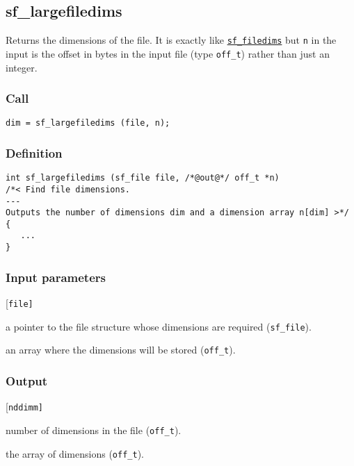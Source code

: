 \subsection{{sf\_largefiledims}}
Returns the dimensions of the file. It is exactly like \hyperref[sec:sf_filedims]{\texttt{sf\_filedims}} but \texttt{n} in the input is the offset in bytes in the input file (type \texttt{off\_t}) rather than just an integer.

\subsubsection*{Call}
\begin{verbatim}dim = sf_largefiledims (file, n);\end{verbatim}

\subsubsection*{Definition}
\begin{verbatim}
int sf_largefiledims (sf_file file, /*@out@*/ off_t *n) 
/*< Find file dimensions.
--- 
Outputs the number of dimensions dim and a dimension array n[dim] >*/
{
   ...
}
\end{verbatim}

\subsubsection*{Input parameters}
\begin{desclist}{\tt }{\quad}[\tt file]
   \setlength\itemsep{0pt}
   \item[file] a pointer to the file structure whose dimensions are required (\texttt{sf\_file}). 
   \item[n] an array where the dimensions will be stored (\texttt{off\_t}).
\end{desclist}

\subsubsection*{Output}
\begin{desclist}{}{\quad}[\tt nddimm]
   \setlength\itemsep{0pt}
   \item[\texttt{dim}]    number of dimensions in the file (\texttt{off\_t}). 
   \item[\texttt{n[dim]}] the array of dimensions (\texttt{off\_t}).
\end{desclist}




